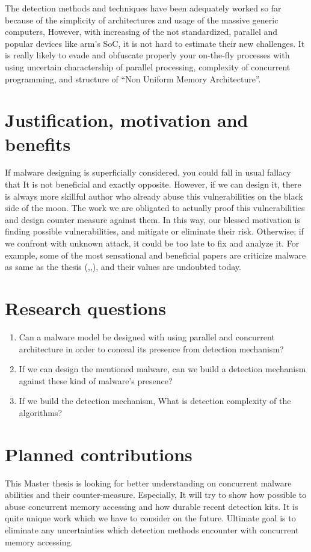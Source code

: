The detection methods and techniques have been adequately worked so far because of the simplicity of architectures and usage of the massive generic computers, However, with increasing of the not standardized, parallel and popular devices like arm’s SoC, it is not hard to estimate their new challenges. It is really likely to evade and obfuscate properly your on-the-fly processes with using uncertain charactership of parallel processing, complexity of concurrent programming, and structure of “Non Uniform Memory Architecture”.


\section{Justification, motivation and benefits}
If malware designing is superficially considered, you could fall in usual fallacy that It is not beneficial and exactly opposite. However, if we can design it, there is always more skillful author who already abuse this vulnerabilities on the black side of the moon. The work we are obligated to actually proof this vulnerabilities and design counter measure against them. In this way, our blessed motivation is finding possible vulnerabilities, and mitigate or eliminate their risk. Otherwise; if we confront with unknown attack, it could be too late to fix and analyze it. For example, some of the most sensational and beneficial papers are criticize malware as same as the thesis (\cite{moser2007limits},\cite{cavallaro2008limits},\cite{egele2012survey}), and their values are undoubted today. 

\section{Research questions}\label{research:questions}

\begin{enumerate}
\item Can a malware model be designed with using parallel and concurrent architecture in order to conceal its presence from detection mechanism?
\item If we can design the mentioned malware, can we build a detection mechanism against these kind of malware's presence?
\item If we build the detection mechanism, What is detection complexity of the algorithms?
\end{enumerate}


\section{Planned contributions}
This Master thesis is looking for better understanding on concurrent malware abilities and their counter-measure. Especially, It will try to show how possible to abuse concurrent memory accessing and how durable recent detection kits. It is quite unique work which we have to consider on the future. Ultimate goal is to eliminate any uncertainties which detection methods encounter with concurrent memory accessing.

